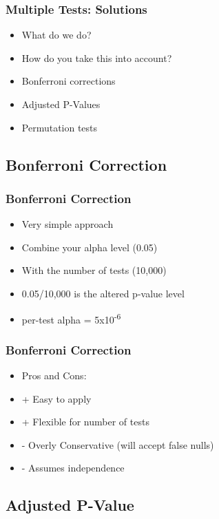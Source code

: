 \documentclass[14pt,handout]{beamer}
\begin{document}
\begin{frame}
\frametitle{Multiple Tests: Solutions}
\begin{itemize}
	\item<+-> What do we do?
	\item<+-> How do you take this into account?
	\item<+-> Bonferroni corrections
	\item<+-> Adjusted P-Values
	\item<+-> Permutation tests
\end{itemize}
\end{frame}


\subsection{Bonferroni Correction}

\begin{frame}
\frametitle{Bonferroni Correction}
\begin{itemize}
	\item<+-> Very simple approach
	\item<+-> Combine your alpha level (0.05)
	\item<+-> With the number of tests (10,000)
	\item<+-> 0.05/10,000 is the altered p-value level
	\item<+-> per-test alpha = 5x10\textsuperscript{-6}
\end{itemize}
\end{frame}

\begin{frame}
\frametitle{Bonferroni Correction}
\begin{itemize}
	\item<+-> Pros and Cons:
	\item<+-> + Easy to apply
	\item<+-> + Flexible for number of tests
	\item<+-> - Overly Conservative (will accept false nulls)
	\item<+-> - Assumes independence
\end{itemize}
\end{frame}

\subsection{Adjusted P-Value}
\end{document}

